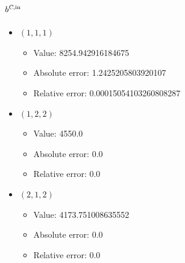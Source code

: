 \documentclass{article}%
\begin{document}
\subsection{$b^{\textsl{C},\text{in}}$}%
\begin{itemize}%
	\item $(1, 1, 1)$%
	\begin{itemize}%
		\item Value: 8254.942916184675%
		\item Absolute error: 1.2425205803920107%
		\item Relative error: 0.00015054103260808287%
	\end{itemize}%
	\item $(1, 2, 2)$%
	\begin{itemize}%
		\item Value: 4550.0%
		\item Absolute error: 0.0%
		\item Relative error: 0.0%
	\end{itemize}%
	\item $(2, 1, 2)$%
	\begin{itemize}%
		\item Value: 4173.751008635552%
		\item Absolute error: 0.0%
		\item Relative error: 0.0%
	\end{itemize}%
\end{itemize}%
\end{document}
